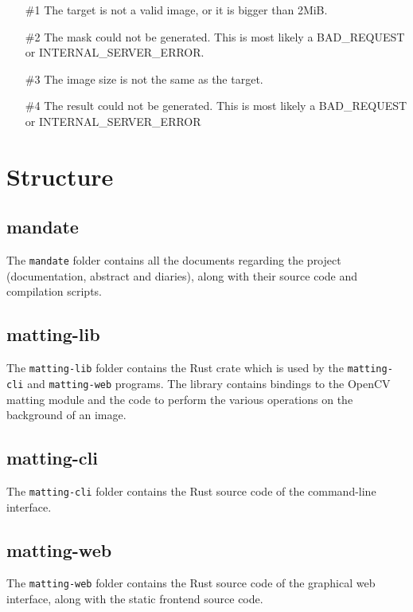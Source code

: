 \documentclass[a4paper]{article}
\begin{document}
\begin{itemize}
    \item[\#1] The target is not a valid image, or it is bigger than 2MiB.
    \item[\#2] The mask could not be generated.
        This is most likely a \textsc{BAD\_REQUEST}
        or \textsc{INTERNAL\_SERVER\_ERROR}.
    \item[\#3] The image size is not the same as the target.
    \item[\#4] The result could not be generated.
        This is most likely a \textsc{BAD\_REQUEST}
        or \textsc{INTERNAL\_SERVER\_ERROR}
\end{itemize}

\pagebreak

\section{Structure}

\subsection{mandate}

The \texttt{mandate} folder contains all the documents regarding
the project (documentation, abstract and diaries),
along with their source code and compilation scripts.

\subsection{matting-lib}

The \texttt{matting-lib} folder contains the Rust crate
which is used by the \texttt{matting-cli}
and \texttt{matting-web} programs.
The library contains bindings to the OpenCV matting module
and the code to perform the various operations on the background
of an image.

\subsection{matting-cli}

The \texttt{matting-cli} folder contains the Rust
source code of the command-line interface.

\subsection{matting-web}

The \texttt{matting-web} folder contains the Rust
source code of the graphical web interface,
along with the static frontend source code.
\end{document}

